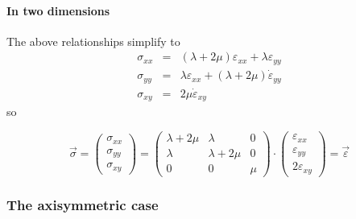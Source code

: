 \paragraph{In two dimensions} The above relationships simplify to 
\begin{eqnarray}
\sigma_{xx} &=& (\lambda+2\mu)  \varepsilon_{xx} + \lambda \varepsilon_{yy} \\
\sigma_{yy} &=& \lambda \varepsilon_{xx} + (\lambda+2\mu)  \dot{\varepsilon}_{yy} \\
\sigma_{xy} &=& 2\mu  \dot{\varepsilon}_{xy} 
\end{eqnarray}
so 

\[
\vec\sigma =
\left(
\begin{array}{c}
\sigma_{xx}\\ 
\sigma_{yy} \\
\sigma_{xy} 
\end{array}
\right)
=
\left(
\begin{array}{ccc}
\lambda+2\mu & \lambda & 0 \\ 
\lambda & \lambda+2\mu & 0 \\
0 & 0 & \mu 
\end{array}
\right)
\cdot
\left(
\begin{array}{c}
\varepsilon_{xx} \\
\varepsilon_{yy} \\
2\varepsilon_{xy} 
\end{array}
\right)
=\vec\varepsilon
\]







\subsubsection{The axisymmetric case} \label{ss:fem_elast_axis}


